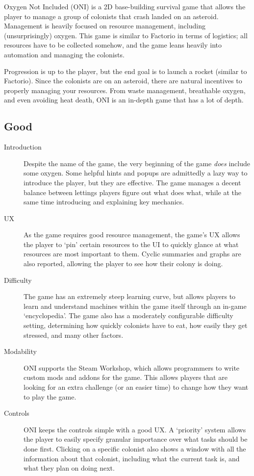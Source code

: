 \documentclass{article}
\begin{document}
Oxygen Not Included (ONI) is a 2D base-building survival game that allows the
player to manage a group of colonists that crash landed on an asteroid.
Management is heavily focused on resource management, including (unsurprisingly)
oxygen. This game is similar to Factorio in terms of logistics; all resources
have to be collected somehow, and the game leans heavily into automation and
managing the colonists.

Progression is up to the player, but the end goal is to launch a rocket (similar
to Factorio). Since the colonists are on an asteroid, there are natural
incentives to properly managing your resources. From waste management,
breathable oxygen, and even avoiding heat death, ONI is an in-depth game that
has a lot of depth.

\subsection{Good}
\begin{description}
      \item[Introduction] Despite the name of the game, the very beginning of
            the game \emph{does} include some oxygen. Some helpful hints and popups
            are admittedly a lazy way to introduce the player, but they are
            effective. The game manages a decent balance between lettings
            players figure out what does what, while at the same time
            introducing and explaining key mechanics.
      \item[UX] As the game requires good resource management, the game's UX
            allows the player to `pin' certain resources to the UI to quickly glance
            at what resources are most important to them. Cyclic summaries and graphs
            are also reported, allowing the player to see how their colony is doing.
      \item[Difficulty] The game has an extremely steep learning curve, but
            allows players to learn and understand machines within the game itself
            through an in-game `encyclopedia'. The game also has a moderately
            configurable difficulty setting, determining how quickly colonists
            have to eat, how easily they get stressed, and many other factors.
      \item[Modability] ONI supports the Steam Workshop, which allows
            programmers to write custom mods and addons for the game. This allows
            players that are looking for an extra challenge (or an easier time) to
            change how they want to play the game.
      \item[Controls] ONI keeps the controls simple with a good UX. A `priority'
            system allows the player to easily specify granular importance over what
            tasks should be done first. Clicking on a specific colonist also
            shows a window with all the information about that colonist,
            including what the current task is, and what they plan on doing next.
\end{description}
\end{document}
